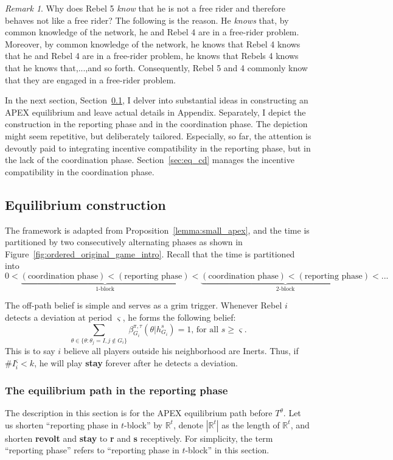 \documentclass[12pt,letter]{article}
\newcommand{\Omicron}{\mathbb{R}}
\theoremstyle{definition}
\theoremstyle{definition}
\theoremstyle{remark}
\newtheorem*{remark}{Remark}
\theoremstyle{claim}
\begin{document}
\begin{remark}
Why does Rebel 5 \textit{know} that he is not a free rider and therefore behaves not like a free rider? The following is the reason. He \textit{knows} that, by common knowledge of the network, he and Rebel 4 are in a free-rider problem. Moreover, by common knowledge of the network, he knows that Rebel 4 knows that he and Rebel 4 are in a free-rider problem, he knows that Rebels 4 knows that he knows that,...,and so forth. Consequently, Rebel 5 and 4 commonly know that they are engaged in a free-rider problem. 
\end{remark}
In the next section, Section~\ref{sec:dis_writing}, I delver into substantial ideas in constructing an APEX equilibrium and leave actual details in Appendix. Separately, I depict the construction in the reporting phase and in the coordination phase. The depiction might seem repetitive, but deliberately tailored. Especially, so far, the attention is devoutly paid to integrating incentive compatibility in the reporting phase, but in the lack of the coordination phase. Section~\ref{sec:eq_cd} manages the incentive compatibility in the coordination phase.
\subsection{Equilibrium construction}
\label{sec:dis_writing}
The framework is adapted from Proposition~\ref{lemma:small_apex}, and the time is partitioned by two consecutively alternating phases as shown in Figure~\ref{fig:ordered_original_game_intro}. Recall that the time is partitioned into
\[0<\underbrace{(\text{coordination phase})<(\text{reporting phase})}_{\text{$1$-block}}<\underbrace{(\text{coordination phase})<(\text{reporting phase})}_{\text{$2$-block}}<...\]

The off-path belief is simple and serves as a grim trigger. Whenever Rebel $i$ detects a deviation at period $\varsigma$, he forms the following belief: 
\begin{equation}
\label{eq_grim_trigger}
\sum_{\theta \in \{\theta:\theta_j=I,j\notin G_i\}}\beta^{\pi,\tau}_{G_i}({\theta}|h^{s}_{G_i})=1 \text{, for all $s\geq \varsigma$}.
\end{equation}
This is to say $i$ believe all players outside his neighborhood are Inerts. Thus, if $\# I^{\varsigma}_i<k$, he will play \textbf{stay} forever after he detects a deviation. 

\subsubsection{The equilibrium path in the reporting phase}
\label{sec:eq_rp}
The description in this section is for the APEX equilibrium path {before} $T^{\theta}$. Let us shorten ``reporting phase in $t$-block'' by $\Omicron^{t}$, denote $|\Omicron^t|$ as the length of $\Omicron^{t}$, and shorten \textbf{revolt} and \textbf{stay} to \textbf{r} and \textbf{s} receptively. For simplicity, the term ``reporting phase'' refers to ``reporting phase in $t$-block'' in this section.
\end{document}
